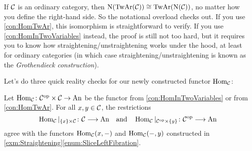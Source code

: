 \begin{rem}\label{rem:TwAr}
	If $\mathcal{C}$ is an ordinary category, then $\operatorname{N}(\operatorname{TwAr}(\mathcal{C}))\cong \operatorname{TwAr}(\operatorname{N}(\mathcal{C}))$, no matter how you define the right-hand side. So the notational overload checks out. If you use \cref{con:HomTwAr}, this isomorphism is straightforward to verify. If you use \cref{con:HomInTwoVariables} instead, the proof is still not too hard, but it requires you to know how straightening/unstraightening works under the hood, at least for ordinary categories (in which case straightening/unstraightening is known as the \emph{Grothendieck construction}). 
\end{rem}
Let's do three quick reality checks for our newly constructed functor $\operatorname{Hom}_{\mathcal{C}}$:
\begin{lem}\label{lem:HomRealityCheck}
	Let $\operatorname{Hom}_{\mathcal{C}}\colon \mathcal{C}^{\mathrm{op}}\times\mathcal{C}\rightarrow\mathrm{An}$ be the functor from \cref{con:HomInTwoVariables} or from \cref{con:HomTwAr}. For all $x,y\in\mathcal{C}$, the restrictions
	\begin{equation*}
		\operatorname{Hom}_{\mathcal{C}}|_{\{x\}\times\mathcal{C}}\colon \mathcal{C}\longrightarrow\mathrm{An}\quad\text{and}\quad \operatorname{Hom}_{\mathcal{C}}|_{\mathcal{C}^{\mathrm{op}}\times\{y\}}\colon \mathcal{C}^{\mathrm{op}}\longrightarrow \mathrm{An}
	\end{equation*}
	agree with the functors $\operatorname{Hom}_{\mathcal{C}}(x,-)$ and $\operatorname{Hom}_{\mathcal{C}}(-,y)$ constructed in \cref{exm:Straightening}\cref{enum:SliceLeftFibration}.
\end{lem}
